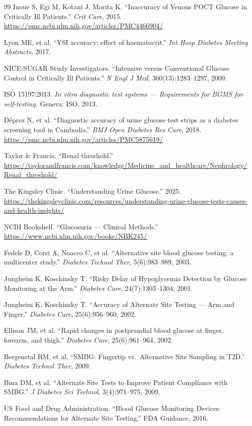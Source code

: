 \begin{thebibliography}{99}
Inoue S, Egi M, Kotani J, Morita K.
``Inaccuracy of Venous POCT Glucose in Critically Ill Patients.''
\textit{Crit Care}, 2015. \url{https://pmc.ncbi.nlm.nih.gov/articles/PMC4466904/}

Lyon ME, et al.
``YSI accuracy: effect of haematocrit.''
\textit{Int Hosp Diabetes Meeting Abstracts}, 2017.

NICE-SUGAR Study Investigators.
``Intensive versus Conventional Glucose Control in Critically Ill Patients.''
\textit{N Engl J Med}, 360(13):1283--1297, 2009.

ISO 15197:2013. \textit{In vitro diagnostic test systems --- Requirements for BGMS for self-testing.} Geneva: ISO, 2013.

D\'{e}prez N, et al.
``Diagnostic accuracy of urine glucose test strips as a diabetes screening tool in Cambodia.''
\textit{BMJ Open Diabetes Res Care}, 2018.
\url{https://pmc.ncbi.nlm.nih.gov/articles/PMC5875619/}

Taylor \& Francis. ``Renal threshold.''
\url{https://taylorandfrancis.com/knowledge/Medicine_and_healthcare/Nephrology/Renal_threshold/}

The Kingsley Clinic. ``Understanding Urine Glucose.'' 2025.
\url{https://thekingsleyclinic.com/resources/understanding-urine-glucose-tests-causes-and-health-insights/}

NCBI Bookshelf. ``Glucosuria --- Clinical Methods.''
\url{https://www.ncbi.nlm.nih.gov/books/NBK245/}

Fedele D, Corsi A, Noacco C, et al.
``Alternative site blood glucose testing: a multicenter study.''
\textit{Diabetes Technol Ther}, 5(6):983--989, 2003.

Jungheim K, Koschinsky T.
``Risky Delay of Hypoglycemia Detection by Glucose Monitoring at the Arm.''
\textit{Diabetes Care}, 24(7):1303--1304, 2001.

Jungheim K, Koschinsky T.
``Accuracy of Alternate Site Testing --- Arm and Finger.''
\textit{Diabetes Care}, 25(6):956--960, 2002.

Ellison JM, et al.
``Rapid changes in postprandial blood glucose at finger, forearm, and thigh.''
\textit{Diabetes Care}, 25(6):961--964, 2002.

Bergenstal RM, et al.
``SMBG: Fingertip vs.\ Alternative Site Sampling in T2D.''
\textit{Diabetes Technol Ther}, 2009.

Bina DM, et al.
``Alternate Site Tests to Improve Patient Compliance with SMBG.''
\textit{J Diabetes Sci Technol}, 3(4):971--975, 2009.

US Food and Drug Administration.
``Blood Glucose Monitoring Devices: Recommendations for Alternate Site Testing.''
FDA Guidance, 2016.

\end{thebibliography}